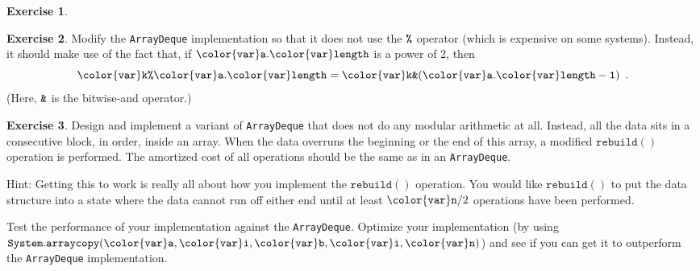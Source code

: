 \documentclass[10pt]{book}
\theoremstyle{plain}
\theoremstyle{definition}
\newtheorem{exc}{Exercise}[chapter]
\begin{document}
\begin{exc}
\end{exc}

\begin{exc}
  Modify the \texttt{ArrayDeque} implementation so that it does not use the
  \ensuremath{\mathtt{\text{\ttfamily \%}}} operator (which is expensive on some systems).  Instead, it
  should make use of the fact that, if \ensuremath{\mathtt{{\color{var}a}.{\color{var}length}}} is a power of 2,
  then 
  \[  \ensuremath{\mathtt{{\color{var}k}\text{\ttfamily \%}{\color{var}a}.{\color{var}length}}}=\ensuremath{\mathtt{{\color{var}k}\text{\ttfamily \&}({\color{var}a}.{\color{var}length}-1)}} \enspace .
  \]
  (Here, \ensuremath{\mathtt{\text{\ttfamily \&}}} is the bitwise-and operator.)
\end{exc}

\begin{exc}
  Design and implement a variant of \texttt{ArrayDeque} that does not do any
  modular arithmetic at all.  Instead, all the data sits in a consecutive
  block, in order, inside an array.  When the data overruns the beginning
  or the end of this array, a modified \ensuremath{\mathtt{rebuild()}} operation is performed.
  The amortized cost of all operations should be the same as in an
  \texttt{ArrayDeque}.

  \noindent Hint: Getting this to work is really all about how you implement
  the \ensuremath{\mathtt{rebuild()}} operation.  You would like \ensuremath{\mathtt{rebuild()}} to put the data
  structure into a state where the data cannot run off either end until
  at least $\ensuremath{\mathtt{{\color{var}n}}}/2$ operations have been performed.

  Test the performance of your implementation against the \texttt{ArrayDeque}.
  Optimize your implementation (by using \ensuremath{\mathtt{System.arraycopy({\color{var}a},{\color{var}i},{\color{var}b},{\color{var}i},{\color{var}n})}})
  and see if you can get it to outperform the \texttt{ArrayDeque} implementation.
\end{exc}
\end{document}
